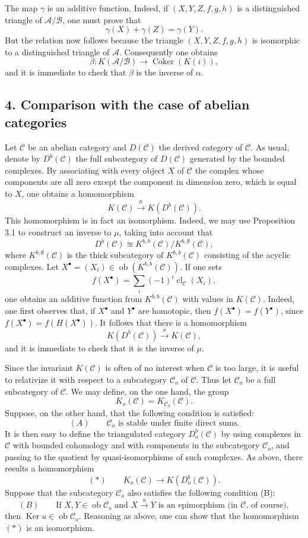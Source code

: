 \documentclass[11pt]{article}
\providecommand{\Ob}{\operatorname{ob}}
\providecommand{\cC}{\mathcal C}
\providecommand{\Ob}{\operatorname{ob}}
\providecommand{\cC}{\mathcal C}
\providecommand{\cA}{\mathcal A}
\providecommand{\cB}{\mathcal B}
\providecommand{\Ob}{\operatorname{Ob}}
\providecommand{\Ob}{\operatorname{ob}}
\providecommand{\Ob}{\operatorname{Ob}}
\begin{document}
The map $\gamma$ is an additive function. Indeed, if $(X,Y,Z,f,g,h)$ is a distinguished triangle of $\cA/\cB$, one must prove that
\[
\gamma(X)+\gamma(Z)=\gamma(Y).
\]
But the relation now follows because the triangle $(X,Y,Z,f,g,h)$ is isomorphic to a distinguished triangle of $\cA$. Consequently one obtains
\[
\beta:K(\cA/\cB)\longrightarrow \operatorname{Coker}(K(i)),
\]
and it is immediate to check that $\beta$ is the inverse of $\alpha$.

\subsection*{4. Comparison with the case of abelian categories}

Let $\cC$ be an abelian category and $D(\cC)$ the derived category of $\cC$. As usual, denote by $D^b(\cC)$ the full subcategory of $D(\cC)$ generated by the bounded complexes. By associating with every object $X$ of $\cC$ the complex whose components are all zero except the component in dimension zero, which is equal to $X$, one obtains a homomorphism
\[
K(\cC)\xrightarrow{\mu}K(D^b(\cC)).
\]
This homomorphism is in fact an isomorphism. Indeed, we may use Proposition 3.1 to construct an inverse to $\mu$, taking into account that
\[
D^b(\cC)\approxeq K^{b,b}(\cC)/K^{b,\emptyset}(\cC),
\]
where $K^{b,\emptyset}(\cC)$ is the thick subcategory of $K^{b,b}(\cC)$ consisting of the acyclic complexes. Let $X^\bullet=(X_i)\in\Ob(K^{b,b}(\cC))$. If one sets
\[
f(X^\bullet)=\sum_i(-1)^i\operatorname{cl}_{\cC}(X_i),
\]
one obtains an additive function from $K^{b,b}(\cC)$ with values in $K(\cC)$. Indeed, one first observes that, if $X^\bullet$ and $Y^\bullet$ are homotopic, then $f(X^\bullet)=f(Y^\bullet)$, since $f(X^\bullet)=f(H(X^\bullet))$. It follows that there is a homomorphism
\[
K(D^b(\cC))\xrightarrow{\nu}K(\cC),
\]
and it is immediate to check that it is the inverse of $\mu$.

Since the invariant $K(\cC)$ is often of no interest when $\cC$ is too large, it is useful to relativize it with respect to a subcategory $\cC_o$ of $\cC$. Thus let $\cC_o$ be a full subcategory of $\cC$. We may define, on the one hand, the group
\[
K_o(\cC)=K_{\cC_o}(\cC).
\]
Suppose, on the other hand, that the following condition is satisfied:
\[
(A)\qquad \cC_o\text{ is stable under finite direct sums.}
\]
It is then easy to define the triangulated category $D_o^b(\cC)$ by using complexes in $\cC$ with bounded cohomology and with components in the subcategory $\cC_o$, and passing to the quotient by quasi-isomorphisms of such complexes. As above, there results a homomorphism
\[
(*)\qquad K_o(\cC)\longrightarrow K(D_o^b(\cC)).
\]
Suppose that the subcategory $\cC_o$ also satisfies the following condition (B):
\[
(B)\qquad
\text{If }X,Y\in\Ob\cC_o\text{ and }X\xrightarrow{u}Y
\text{ is an epimorphism (in }\cC\text{, of course)},
\]
then $\operatorname{Ker}u\in\Ob\cC_o$. Reasoning as above, one can show that the homomorphism $(*)$ is an isomorphism.
\end{document}
